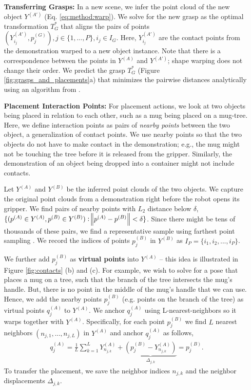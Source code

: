 \documentclass{article}
\begin{document}
\textbf{Transferring Grasps:} In a new scene, we infer the point cloud of the new object $Y^{(A')}$ (Eq. \ref{eq:method:warp}). We solve for the new grasp as the optimal transformation $T_G^*$ that aligns the pairs of points $(Y^{(A')}_{i_j}, p^{(G)}_j), j \in \{1, ..., P\}, i_j \in I_G$. Here, $Y^{(A')}_{i_j}$ are the contact points from the demonstration warped to a new object instance. Note that there is a correspondence between the points in $Y^{(A)}$ and $Y^{(A')}$; shape warping does not change their order. We predict the grasp $T_G^*$ (Figure \ref{fig:grasps_and_placements}a) that minimizes the pairwise distances analytically using an algorithm from \citet{horn88computation}.

\textbf{Placement Interaction Points:} For placement actions, we look at two objects being placed in relation to each other, such as a mug being placed on a mug-tree. Here, we define interaction points as pairs of \textit{nearby points} between the two object, a generalization of contact points. We use nearby points so that the two objects do not have to make contact in the demonstration; e.g., the mug might not be touching the tree before it is released from the gripper. Similarly, the demonstration of an object being dropped into a container might not include contacts.

Let $Y^{(A)}$ and $Y^{(B)}$ be the inferred point clouds of the two objects. We capture the original point clouds from a demonstration right before the robot opens its gripper. We find pairs of nearby points with $L_2$ distance below $\delta$, $\{ (p^{(A)} \in Y^{(A)}, p^{(B)} \in Y^{(B)}) : \norm{p^{(A)} - p^{(B)}} < \delta \}$. Since there might be tens of thousands of these pairs, we find a representative sample using farthest point sampling \cite{eldar94farthest}. We record the indices of points $p^{(B)}_j$ in $Y^{(B)}$ as $I_P = \{ i_1, i_2, ..., i_P \}$.

We further add $p^{(B)}_j$ as \textbf{virtual points} into $Y^{(A)}$ -- this idea is illustrated in Figure \ref{fig:contacts} (b) and (c). For example, we wish to solve for a pose that places a mug on a tree, such that the branch of the tree intersects the mug's handle. But, there is no point in the middle of the mug's handle that we can use. Hence, we add the nearby points $p^{(B)}_j$ (e.g. points on the branch of the tree) as virtual points $q^{(A)}_j$ to $Y^{(A)}$. We anchor $q^{(A)}_j$ using L-nearest-neighbors so it warps together with $Y^{(A)}$. Specifically, for each point $p^{(B)}_j$ we find $L$ nearest neighbors $(n_{j,1}, ..., n_{j,L})$ in $Y^{(A)}$ and anchor $q^{(A)}_j$ as follows,
\begin{align}
    q^{(A)}_j = \frac{1}{L} \sum_{k=1}^L Y^{(A)}_{n_{j,k}} + \underbrace{(p^{(B)}_j - Y^{(A)}_{n_{j,k}})}_{\Delta_{j,k}} = p^{(B)}_j.
\end{align}
To transfer the placement, we save the neighbor indices $n_{j,k}$ and the neighbor displacements $\Delta_{j,k}$.
\end{document}
